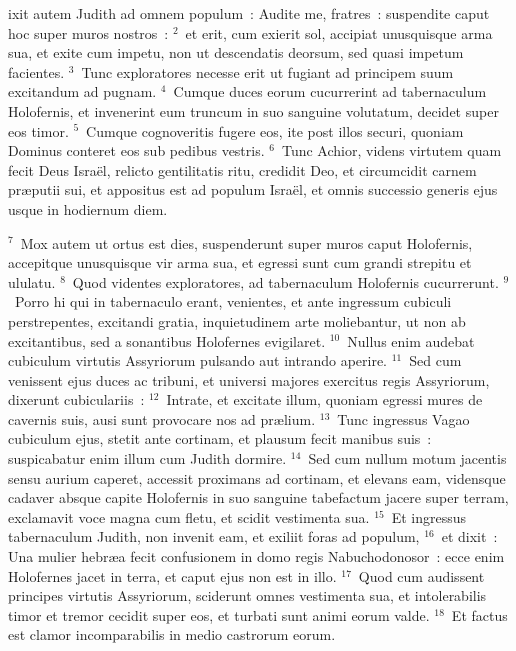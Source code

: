 \bchapter
{}ixit autem Judith ad omnem populum~: Audite me, fratres~: suspendite caput hoc super muros nostros~:
${}^{2}$~et erit, cum exierit sol, accipiat unusquisque arma sua, et exite cum impetu, non ut descendatis deorsum, sed quasi impetum facientes.
${}^{3}$~Tunc exploratores necesse erit ut fugiant ad principem suum excitandum ad pugnam.
${}^{4}$~Cumque duces eorum cucurrerint ad tabernaculum Holofernis, et invenerint eum truncum in suo sanguine volutatum, decidet super eos timor.
${}^{5}$~Cumque cognoveritis fugere eos, ite post illos securi, quoniam Dominus conteret eos sub pedibus vestris.
${}^{6}$~Tunc Achior, videns virtutem quam fecit Deus Isra\"el, relicto gentilitatis ritu, credidit Deo, et circumcidit carnem pr\ae putii sui, et appositus est ad populum Isra\"el, et omnis successio generis ejus usque in hodiernum diem.


${}^{7}$~Mox autem ut ortus est dies, suspenderunt super muros caput Holofernis, accepitque unusquisque vir arma sua, et egressi sunt cum grandi strepitu et ululatu.
${}^{8}$~Quod videntes exploratores, ad tabernaculum Holofernis cucurrerunt.
${}^{9}$~Porro hi qui in tabernaculo erant, venientes, et ante ingressum cubiculi perstrepentes, excitandi gratia, inquietudinem arte moliebantur, ut non ab excitantibus, sed a sonantibus Holofernes evigilaret.
${}^{10}$~Nullus enim audebat cubiculum virtutis Assyriorum pulsando aut intrando aperire.
${}^{11}$~Sed cum venissent ejus duces ac tribuni, et universi majores exercitus regis Assyriorum, dixerunt cubiculariis~:
${}^{12}$~Intrate, et excitate illum, quoniam egressi mures de cavernis suis, ausi sunt provocare nos ad pr\ae lium.
${}^{13}$~Tunc ingressus Vagao cubiculum ejus, stetit ante cortinam, et plausum fecit manibus suis~: suspicabatur enim illum cum Judith dormire.
${}^{14}$~Sed cum nullum motum jacentis sensu aurium caperet, accessit proximans ad cortinam, et elevans eam, vidensque cadaver absque capite Holofernis in suo sanguine tabefactum jacere super terram, exclamavit voce magna cum fletu, et scidit vestimenta sua.
${}^{15}$~Et ingressus tabernaculum Judith, non invenit eam, et exiliit foras ad populum,
${}^{16}$~et dixit~: Una mulier hebr\ae a fecit confusionem in domo regis Nabuchodonosor~: ecce enim Holofernes jacet in terra, et caput ejus non est in illo.
${}^{17}$~Quod cum audissent principes virtutis Assyriorum, sciderunt omnes vestimenta sua, et intolerabilis timor et tremor cecidit super eos, et turbati sunt animi eorum valde.
${}^{18}$~Et factus est clamor incomparabilis in medio castrorum eorum.

